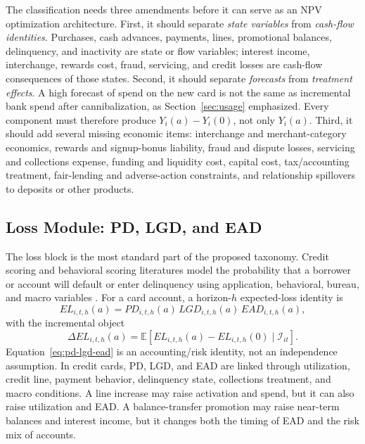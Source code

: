 \documentclass[11pt]{article}
\newcommand{\E}{\mathbb{E}}
\newcommand{\1}{\mathbf{1}}
\begin{document}
The classification needs three amendments before it can serve as an NPV
optimization architecture. First, it should separate \emph{state variables} from
\emph{cash-flow identities}. Purchases, cash advances, payments, lines,
promotional balances, delinquency, and inactivity are state or flow variables;
interest income, interchange, rewards cost, fraud, servicing, and credit losses
are cash-flow consequences of those states. Second, it should separate
\emph{forecasts} from \emph{treatment effects}. A high forecast of spend on the
new card is not the same as incremental bank spend after cannibalization, as
Section~\ref{sec:usage} emphasized. Every component must therefore produce
$Y_i(a)-Y_i(0)$, not only $Y_i(a)$. Third, it should add several missing
economic items: interchange and merchant-category economics, rewards and
signup-bonus liability, fraud and dispute losses, servicing and collections
expense, funding and liquidity cost, capital cost, tax/accounting treatment,
fair-lending and adverse-action constraints, and relationship spillovers to
deposits or other products.

\subsection{Loss Module: PD, LGD, and EAD}
\label{subsec:loss-module}

The loss block is the most standard part of the proposed taxonomy. Credit
scoring and behavioral scoring literatures model the probability that a
borrower or account will default or enter delinquency using application,
behavioral, bureau, and macro variables \citep{hand1997credit,thomas2000survey,lessmann2015benchmarking}.
For a card account, a horizon-$h$ expected-loss identity is
\begin{equation}
  EL_{i,t,h}(a)
  =
  PD_{i,t,h}(a)\,
  LGD_{i,t,h}(a)\,
  EAD_{i,t,h}(a),
  \label{eq:pd-lgd-ead}
\end{equation}
with the incremental object
\begin{equation}
  \Delta EL_{i,t,h}(a)
  =
  \E\!\left[
    EL_{i,t,h}(a)-EL_{i,t,h}(0)
    \mid \mathcal{I}_{it}
  \right].
  \label{eq:incremental-el}
\end{equation}
Equation~\eqref{eq:pd-lgd-ead} is an accounting/risk identity, not an
independence assumption. In credit cards, PD, LGD, and EAD are linked through
utilization, credit line, payment behavior, delinquency state, collections
treatment, and macro conditions. A line increase may raise activation and spend,
but it can also raise utilization and EAD. A balance-transfer promotion may
raise near-term balances and interest income, but it changes both the timing of
EAD and the risk mix of accounts.
\end{document}
